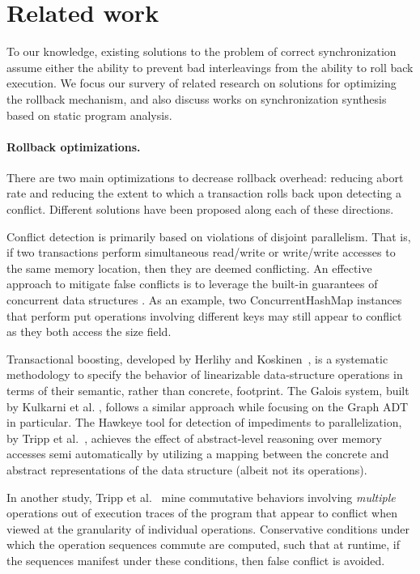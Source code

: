 \section{Related work}

To our knowledge, existing solutions to the problem of correct synchronization assume either the ability to prevent bad interleavings from the ability to roll back execution. We focus our survery of related research on solutions for optimizing the rollback mechanism, and also discuss works on synchronization synthesis based on static program analysis.

\paragraph{Rollback optimizations.} There are two main optimizations to decrease rollback overhead: reducing abort rate and reducing the extent to which a transaction rolls back upon detecting a conflict. Different solutions have been proposed along each of these directions.

Conflict detection is primarily based on violations of disjoint parallelism. That is, if two transactions perform simultaneous read/write or write/write accesses to the same memory location, then they are deemed conflicting. 
%
An effective approach to mitigate false conflicts is to leverage the built-in guarantees of concurrent data structures \cite{ppopp/HerlihyK08,Galois,TYFS:OOPSLA11}. As an example, two {\sf ConcurrentHashMap} instances that perform {\sf put} operations involving different keys may still appear to conflict as they both access the {\sf size} field.

Transactional boosting, developed by Herlihy and Koskinen~\cite{ppopp/HerlihyK08}, is a systematic methodology to specify the behavior of linearizable data-structure operations in terms of their semantic, rather than concrete, footprint. The Galois system, built by Kulkarni et al. \cite{Galois}, follows a similar approach while focusing on the {\sf Graph} ADT in particular. The Hawkeye tool for detection of impediments to parallelization, by Tripp et al.~\cite{TYFS:OOPSLA11}, achieves the effect of abstract-level reasoning over memory accesses semi automatically by utilizing a mapping between the concrete and abstract representations of the data structure (albeit not its operations).  

In another study, Tripp et al.~\cite{TMFS:PLDI12} mine commutative behaviors involving \emph{multiple} operations out of execution traces of the program that appear to conflict when viewed at the granularity of individual operations. Conservative conditions under which the operation sequences commute are computed, such that at runtime, if the sequences manifest under these conditions, then false conflict is avoided.

